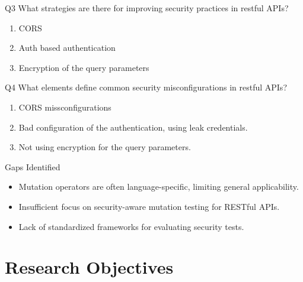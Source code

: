 \documentclass[12pt]{beamer}
\theoremstyle{remark}
\theoremstyle{definition}
\begin{document}
\begin{frame}[allowframebreaks]
\pagebreak
\begin{block}{Q3}
    What strategies are there for improving security practices in restful APIs?
    \begin{enumerate}
      \item CORS
      \item Auth based authentication
      \item Encryption of the query parameters
    \end{enumerate}
  \end{block}
\pagebreak
\begin{block}{Q4}
    What elements define common security misconfigurations in restful APIs?
    \begin{enumerate}
      \item CORS missconfigurations
      \item Bad configuration of the authentication, using leak credentials.
      \item Not using encryption for the query parameters.
    \end{enumerate}

\end{block}
\pagebreak
\begin{block}{Gaps Identified}
\begin{itemize}
    \item Mutation operators are often language-specific, limiting general applicability.
    \item Insufficient focus on security-aware mutation testing for RESTful APIs.
    \item Lack of standardized frameworks for evaluating security tests.
\end{itemize}
\end{block}
\end{frame}

\section{Research Objectives}
\end{document}
